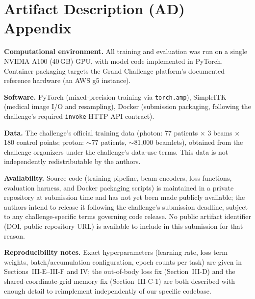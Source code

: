 \documentclass[10pt,conference]{IEEEtran}
\begin{document}
\appendix
\section*{Artifact Description (AD) Appendix}

\textbf{Computational environment.} All training and evaluation was run
on a single NVIDIA A100 (40\,GB) GPU, with model code implemented in
PyTorch. Container packaging targets the Grand Challenge platform's
documented reference hardware (an AWS g5 instance).

\textbf{Software.} PyTorch (mixed-precision training via
\texttt{torch.amp}), SimpleITK (medical image I/O and resampling),
Docker (submission packaging, following the challenge's required
\texttt{invoke} HTTP API contract).

\textbf{Data.} The challenge's official training data
(photon: 77 patients $\times$ 3 beams $\times$ 180 control points;
proton: $\sim$77 patients, $\sim$81{,}000 beamlets), obtained from the
challenge organizers under the challenge's data-use terms. This data is
not independently redistributable by the authors.

\textbf{Availability.} Source code (training pipeline, beam encoders,
loss functions, evaluation harness, and Docker packaging scripts) is
maintained in a private repository at submission time and has not yet
been made publicly available; the authors intend to release it
following the challenge's submission deadline, subject to any
challenge-specific terms governing code release. No public artifact
identifier (DOI, public repository URL) is available to include in this
submission for that reason.

\textbf{Reproducibility notes.} Exact hyperparameters (learning rate,
loss term weights, batch/accumulation configuration, epoch counts per
task) are given in Sections~III-E–III-F and IV; the out-of-body loss fix
(Section~III-D) and the shared-coordinate-grid memory fix
(Section~III-C-1) are both described with enough detail to reimplement
independently of our specific codebase.
\end{document}
